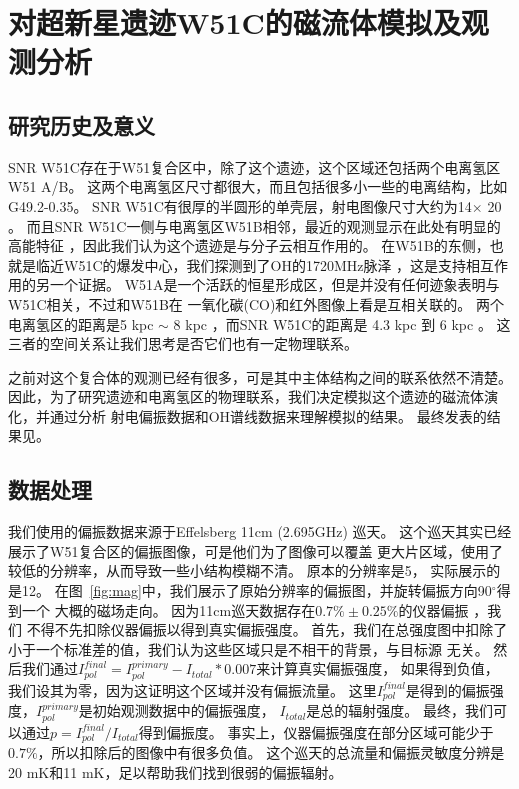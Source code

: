 \chapter{对超新星遗迹W51C的磁流体模拟及观测分析}
\label{W51C}



\section{研究历史及意义}
\label{W51Cintro}
SNR W51C存在于W51复合区中，除了这个遗迹，这个区域还包括两个电离氢区W51 A/B。
这两个电离氢区尺寸都很大，而且包括很多小一些的电离结构，比如G49.2-0.35。
SNR W51C有很厚的半圆形的单壳层，射电图像尺寸大约为14\am $\times$ 20\am
\citep{Copetti1991,Subrahmanyan1995}。
而且SNR W51C一侧与电离氢区W51B相邻，最近的观测显示在此处有明显的高能特征
\citep{Abdo2009,Aleksic2012}，因此我们认为这个遗迹是与分子云相互作用的。
在W51B的东侧，也就是临近W51C的爆发中心，我们探测到了OH的1720MHz脉泽
\citep{Hewitt2008,Brogan2013}，这是支持相互作用的另一个证据。
W51A是一个活跃的恒星形成区，但是并没有任何迹象表明与W51C相关，不过和W51B在
一氧化碳(CO)和红外图像上看是互相关联的\citep{Kang2010,Parsons2012,Ginsburg2015}。
两个电离氢区的距离是5 kpc $\sim$ 8 kpc
\citep{Genzel1981,Schneps1981,Xu2009,Sato2010,Tian2013}，而SNR W51C的距离是
4.3 kpc \citep{Tian2013} 到 6 kpc \citep{Koo1995}。
这三者的空间关系让我们思考是否它们也有一定物理联系。

之前对这个复合体的观测已经有很多，可是其中主体结构之间的联系依然不清楚。
因此，为了研究遗迹和电离氢区的物理联系，我们决定模拟这个遗迹的磁流体演化，并通过分析
射电偏振数据和OH谱线数据来理解模拟的结果。
最终发表的结果见\citet{Zhang2017}。

\section{数据处理}
\label{W51Cdata}

我们使用的偏振数据来源于Effelsberg 11cm (2.695GHz) 巡天\citep{1999A&A...350..447D}。
这个巡天其实已经展示了W51复合区的偏振图像，可是他们为了图像可以覆盖
更大片区域，使用了较低的分辨率，从而导致一些小结构模糊不清。
原本的分辨率是5\am， 实际展示的是12\am。
在图~\ref{fig:mag}中，我们展示了原始分辨率的偏振图，并旋转偏振方向90$^{\circ}$得到一个
大概的磁场走向。
因为11cm巡天数据存在$0.7\% \pm 0.25\%$的仪器偏振 \citep{1987A&AS...69..451J}，我们
不得不先扣除仪器偏振以得到真实偏振强度。
首先，我们在总强度图中扣除了小于一个标准差的值，我们认为这些区域只是不相干的背景，与目标源
无关。
然后我们通过$I^{final}_{pol}=I^{primary}_{pol}-I_{total}*0.007$来计算真实偏振强度，
如果得到负值，我们设其为零，因为这证明这个区域并没有偏振流量。
这里$I^{final}_{pol}$是得到的偏振强度，$I^{primary}_{pol}$是初始观测数据中的偏振强度，
$I_{total}$是总的辐射强度。
最终，我们可以通过$p=I^{final}_{pol}/I_{total}$得到偏振度。
事实上，仪器偏振强度在部分区域可能少于$0.7\%$，所以扣除后的图像中有很多负值。
这个巡天的总流量和偏振灵敏度分辨是20 mK和11 mK，足以帮助我们找到很弱的偏振辐射。

